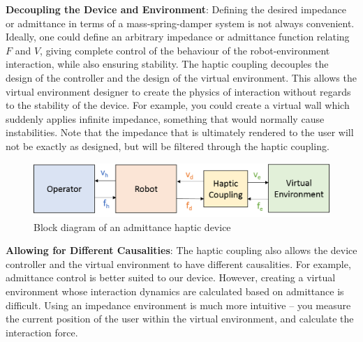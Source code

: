 \documentclass[12pt]{report}
\begin{document}
	
	\textbf{Decoupling the Device and Environment}: Defining the desired impedance or admittance in terms of a mass-spring-damper system is not always convenient. Ideally, one could define an arbitrary impedance or admittance function relating $F$ and $V$, giving complete control of the behaviour of the robot-environment interaction, while also ensuring stability. The haptic coupling decouples the design of the controller and the design of the virtual environment. This allows the virtual environment designer to create the physics of interaction without regards to the stability of the device. For example, you could create a virtual wall which suddenly applies infinite impedance, something that would normally cause instabilities. Note that the impedance that is ultimately rendered to the user will not be exactly as designed, but will be filtered through the haptic coupling.
	
		\begin{figure}[h] 
		\centering
		\includegraphics[width=\linewidth]{haptic_admittance_coupling}
		\caption{Block diagram of an admittance haptic device}
		\label{fig:haptic_adm_coup}
	\end{figure}	
	
	\textbf{Allowing for Different Causalities}: The haptic coupling also allows the device controller and the virtual environment to have different causalities. For example, admittance control is better suited to our device. However, creating a virtual environment whose interaction dynamics are calculated based on admittance is difficult. Using an impedance environment is much more intuitive -- you measure the current position of the user within the virtual environment, and calculate the interaction force. \\
		
	
\end{document}
